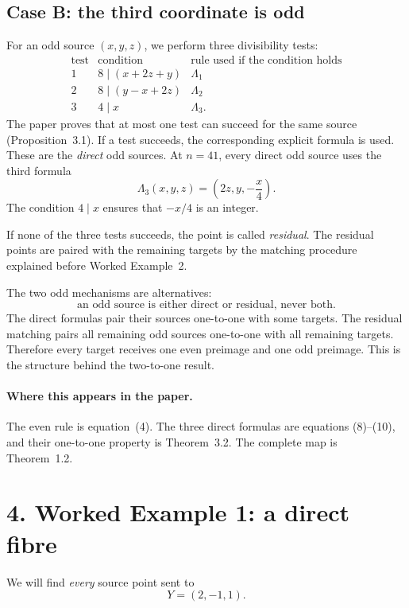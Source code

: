 \documentclass[11pt]{amsart}
\begin{document}
\subsection*{Case B: the third coordinate is odd}

For an odd source \((x,y,z)\), we perform three divisibility tests:
\[
\begin{array}{c|c|c}
\text{test}&\text{condition}&\text{rule used if the condition holds}\\ \hline
1&8\mid(x+2z+y)&\Lambda_1\\
2&8\mid(y-x+2z)&\Lambda_2\\
3&4\mid x&\Lambda_3.
\end{array}
\]
The paper proves that at most one test can succeed for the same source
(Proposition~3.1).  If a test succeeds, the corresponding explicit formula
is used.  These are the \emph{direct} odd sources.  At \(n=41\), every direct
odd source uses the third formula
\[
 \Lambda_3(x,y,z)=\left(2z,y,-\frac{x}{4}\right). \tag{direct rule at \(n=41\)}
\]
The condition \(4\mid x\) ensures that \(-x/4\) is an integer.

If none of the three tests succeeds, the point is called \emph{residual}.
The residual points are paired with the remaining targets by the matching
procedure explained before Worked Example~2.

The two odd mechanisms are alternatives:
\[
 \text{an odd source is either direct or residual, never both.}
\]
The direct formulas pair their sources one-to-one with some targets.  The
residual matching pairs all remaining odd sources one-to-one with all
remaining targets.  Therefore every target receives one even preimage and
one odd preimage.  This is the structure behind the two-to-one result.

\paragraph{Where this appears in the paper.}
The even rule is equation~(4).  The three direct formulas are equations
(8)--(10), and their one-to-one property is Theorem~3.2.  The complete map is
Theorem~1.2.

\newpage
\section*{4. Worked Example 1: a direct fibre}

We will find \emph{every} source point sent to
\[
 Y=(2,-1,1).
\]
\end{document}
